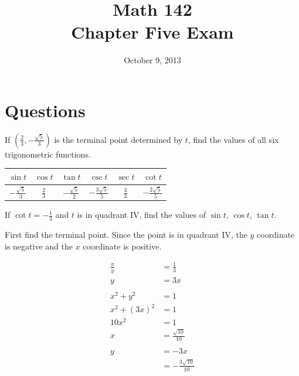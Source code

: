 \documentclass[fleqn,addpoints]{exam}
\author{}
\date{October 9, 2013}
\title{Math 142 \\ Chapter Five Exam}
\begin{document}
  \maketitle


  \section{Questions}

  \begin{questions}
    
    \question[6]
      If $\left( \frac{2}{3}, - \frac{\sqrt{5}}{3} \right)$ is the terminal point determined by $t$, find the values of
      all six trigonometric functions. 
      
      \begin{solution}
        \begin{tabular}[H]{cccccc}
          \toprule
          $\sin t$               & $\cos t$      & $\tan t$               & $\csc t$                 & $\sec t$      & $\cot t$ \\
          \midrule
          $- \frac{\sqrt{5}}{3}$ & $\frac{2}{3}$ & $- \frac{\sqrt{5}}{2}$ & $- \frac{3 \sqrt{5}}{5}$ & $\frac{3}{2}$ & $- \frac{2 \sqrt{5}}{5}$ \\
          \bottomrule
        \end{tabular}
      \end{solution}

    \question[8]
      If $\cot t = - \frac{1}{3}$ and $t$ is in quadrant IV, find the values of $\sin t$, $\cos t$, $\tan t$.

      \begin{solution}
        First find the terminal point.  Since the point is in quadrant IV, the $y$ coordinate is negative and the $x$
        coordinate is positive.

        \begin{align*}
          \frac{x}{y}  & = \frac{1}{3} \\
          y            & = 3x \\
          \\
          x^2 + y^2    & = 1 \\
          x^2 + (3x)^2 & = 1 \\
          10 x^2       & = 1 \\
          x            & = \frac{\sqrt{10}}{10} \\
          \\
          y            & = -3x \\
                       & = -\frac{3 \sqrt{10}}{10}  \\
        \end{align*}


\end{solution}
\end{questions}
\end{document}

